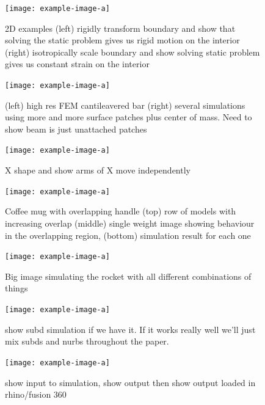 \begin{figure}
  \texttt{[image: example-image-a]}
  \caption{2D examples (left) rigidly transform boundary and show that solving the static problem gives us rigid motion on the interior (right) isotropically scale boundary and show solving static problem gives us constant strain on the interior}
  \label{fig:patchtest}
\end{figure}

\begin{figure}
  \texttt{[image: example-image-a]}
  \caption{(left) high res FEM cantileavered bar (right) several simulations using more and more surface patches plus center of mass. Need to show beam is just  unattached patches}
  \label{fig:convergence}
\end{figure}

\begin{figure}
  \texttt{[image: example-image-a]}
  \caption{X shape and show arms of X move independently}
  \label{fig:independence}
\end{figure}

\begin{figure}
  \texttt{[image: example-image-a]}
  \caption{Coffee mug with overlapping handle (top) row of models with increasing overlap (middle) single weight image showing behaviour in the overlapping region, (bottom) simulation result for each one}
  \label{fig:badmodels}
\end{figure}

\begin{figure}
  \texttt{[image: example-image-a]}
  \caption{Big image simulating the rocket with all different combinations of things}
  \label{fig:materials}
\end{figure}

\begin{figure}
  \texttt{[image: example-image-a]}
  \caption{show subd simulation if we have it. If it works really well we'll just mix subds and nurbs throughout the paper. }
  \label{fig:subd}
\end{figure}

\begin{figure}
  \texttt{[image: example-image-a]}
  \caption{show input to simulation, show output then show output loaded in rhino/fusion 360 }
  \label{fig:edit}
\end{figure}


